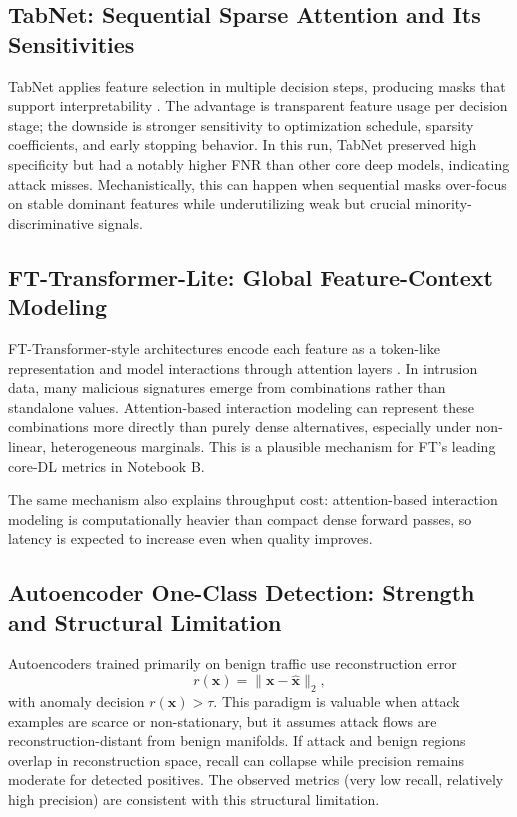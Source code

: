 \documentclass[10pt,journal]{IEEEtran}
\begin{document}
\subsection{TabNet: Sequential Sparse Attention and Its Sensitivities}
TabNet applies feature selection in multiple decision steps, producing masks that support interpretability \cite{arik2021tabnet}. The advantage is transparent feature usage per decision stage; the downside is stronger sensitivity to optimization schedule, sparsity coefficients, and early stopping behavior. In this run, TabNet preserved high specificity but had a notably higher FNR than other core deep models, indicating attack misses. Mechanistically, this can happen when sequential masks over-focus on stable dominant features while underutilizing weak but crucial minority-discriminative signals.

\subsection{FT-Transformer-Lite: Global Feature-Context Modeling}
FT-Transformer-style architectures encode each feature as a token-like representation and model interactions through attention layers \cite{gorishniy2021revisiting}. In intrusion data, many malicious signatures emerge from combinations rather than standalone values. Attention-based interaction modeling can represent these combinations more directly than purely dense alternatives, especially under non-linear, heterogeneous marginals. This is a plausible mechanism for FT's leading core-DL metrics in Notebook B.

The same mechanism also explains throughput cost: attention-based interaction modeling is computationally heavier than compact dense forward passes, so latency is expected to increase even when quality improves.

\subsection{Autoencoder One-Class Detection: Strength and Structural Limitation}
Autoencoders trained primarily on benign traffic use reconstruction error
\begin{equation}
r(\mathbf{x}) = \lVert \mathbf{x} - \hat{\mathbf{x}}\rVert_2,
\end{equation}
with anomaly decision $r(\mathbf{x}) > \tau$. This paradigm is valuable when attack examples are scarce or non-stationary, but it assumes attack flows are reconstruction-distant from benign manifolds. If attack and benign regions overlap in reconstruction space, recall can collapse while precision remains moderate for detected positives. The observed metrics (very low recall, relatively high precision) are consistent with this structural limitation.
\end{document}
